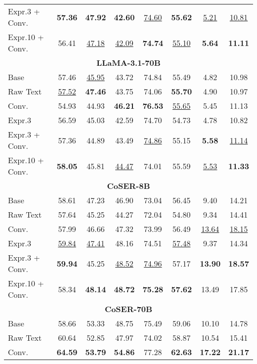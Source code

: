 \begin{table*}[htbp]
{\begin{tabular}{lccccccc}
Expr.3 + Conv. & \textbf{57.36} & \textbf{47.92} & \textbf{42.60} & \underline{74.60} & \textbf{55.62} & \underline{5.21} & \underline{10.81} \\
Expr.10 + Conv. & 56.41 & \underline{47.18} & \underline{42.09} & \textbf{74.74} & \underline{55.10} & \textbf{5.64} & \textbf{11.11} \\
\midrule
\multicolumn{8}{c}{\textbf{LLaMA-3.1-70B}} \\
\midrule
Base & 57.46 & \underline{45.95} & 43.72 & 74.84 & 55.49 & 4.82 & 10.98 \\
Raw Text & \underline{57.52} & \textbf{47.46} & 43.75 & 74.06 & \textbf{55.70} & 4.90 & 10.97 \\
Conv. & 54.93 & 44.93 & \textbf{46.21} & \textbf{76.53} & \underline{55.65} & 5.45 & 11.13 \\
Expr.3 & 56.59 & 45.03 & 42.59 & 74.70 & 54.73 & 4.78 & 10.82 \\
Expr.3 + Conv. & 57.36 & 44.89 & 43.49 & \underline{74.86} & 55.15 & \textbf{5.58} & \underline{11.14} \\
Expr.10 + Conv. & \textbf{58.05} & 45.81 & \underline{44.47} & 74.01 & 55.59 & \underline{5.53} & \textbf{11.33} \\
\midrule
\multicolumn{8}{c}{\textbf{CoSER-8B}} \\
\midrule
Base & 58.61 & 47.23 & 46.90 & 73.04 & 56.45 & 9.40 & 14.21 \\
Raw Text & 57.64 & 45.25 & 44.27 & 72.04 & 54.80 & 9.34 & 14.41 \\
Conv. & 57.99 & 46.66 & 47.32 & 73.99 & 56.49 & \underline{13.64} & \underline{18.15} \\
Expr.3 & \underline{59.84} & \underline{47.41} & 48.16 & 74.51 & \underline{57.48} & 9.37 & 14.34 \\
Expr.3 + Conv. & \textbf{59.94} & 45.25 & \underline{48.52} & \underline{74.96} & 57.17 & \textbf{13.90} & \textbf{18.57} \\
Expr.10 + Conv. & 58.34 & \textbf{48.14} & \textbf{48.72} & \textbf{75.28} & \textbf{57.62} & 13.49 & 17.85 \\
\midrule
\multicolumn{8}{c}{\textbf{CoSER-70B}} \\
\midrule
Base & 58.66 & 53.33 & 48.75 & 75.49 & 59.06 & 10.10 & 14.78 \\
Raw Text & 60.64 & 52.85 & 47.97 & 74.02 & 58.87 & 10.54 & 15.41 \\
Conv. & \textbf{64.59} & \textbf{53.79} & \textbf{54.86} & 77.28 & \textbf{62.63} & \textbf{17.22} & \textbf{21.17} \\

\end{tabular}}
\end{table*}
